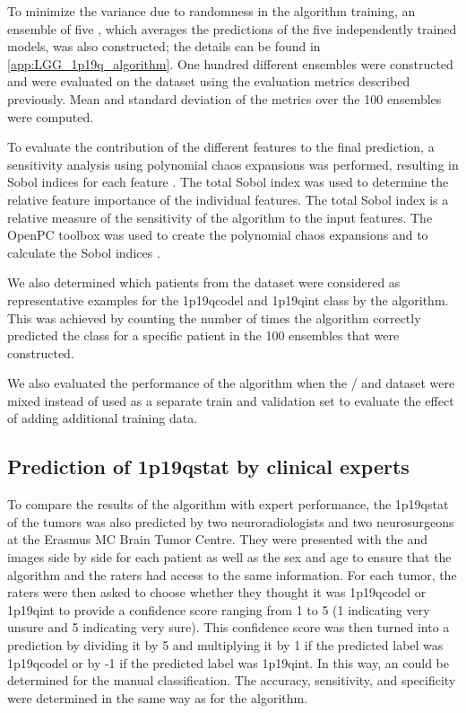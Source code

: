 To minimize the variance due to randomness in the algorithm training, an ensemble of five , which averages the predictions of the five independently trained models, was also constructed; the details can be found in \cref{app:LGG_1p19q_algorithm}.
One hundred different ensembles were constructed and were evaluated on the  dataset using the evaluation metrics described previously.
Mean and standard deviation of the metrics over the 100 ensembles were computed.

To evaluate the contribution of the different features to the final prediction, a sensitivity analysis using polynomial chaos expansions was performed, resulting in Sobol indices for each feature \autocite{sudret2008global}.
The total Sobol index was used to determine the relative feature importance of the individual features.
The total Sobol index is a relative measure of the sensitivity of the algorithm to the input features.
The OpenPC toolbox was used to create the polynomial chaos expansions and to calculate the Sobol indices \autocite{perko2016fast, van2016robustness}.

We also determined which patients from the  dataset were considered as representative examples for the \acl{1p19qcodel} and \acl{1p19qint} class by the algorithm.
This was achieved by counting the number of times the algorithm correctly predicted the class for a specific patient in the 100 ensembles that were constructed.

We also evaluated the performance of the algorithm when the / and  dataset were mixed instead of used as a separate train and validation set to evaluate the effect of adding additional training data.
\subsection{Prediction of \acl{1p19qstat} by clinical experts}

To compare the results of the algorithm with expert performance, the \acl{1p19qstat} of the  \glspl{tumor} was also predicted by two neuroradiologists and two neurosurgeons at the Erasmus MC Brain Tumor Centre.
They were presented with the  and  images side by side for each patient as well as the sex and age to ensure that the algorithm and the raters had access to the same information.
For each \gls{tumor}, the raters were then asked to choose whether they thought it was \acl{1p19qcodel} or \acl{1p19qint} to provide a confidence score ranging from 1 to 5 (1 indicating very unsure and 5 indicating very sure).
This confidence score was then turned into a prediction  by dividing it by 5 and multiplying it by 1 if the predicted label was \acl{1p19qcodel} or by -1 if the predicted label was \acl{1p19qint}.
In this way, an  could be determined for the manual classification.
The accuracy, sensitivity, and specificity were determined in the same way as for the algorithm.

